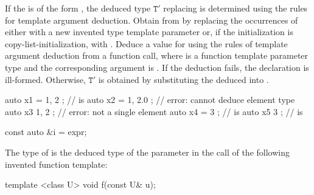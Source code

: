 \pnum
If the  is of the form
 ,
the deduced type
$\mathtt{T}'$ replacing 
is determined using the rules for template argument deduction.
Obtain  from
 by replacing the occurrences of
  either with
a new invented type template parameter  or,
if the initialization is copy-list-initialization, with
. Deduce a value for  using the rules
of template argument deduction from a function call,
where  is a
function template parameter type and
the corresponding argument is .
If the deduction fails, the declaration is ill-formed.
Otherwise, $\mathtt{T}'$ is obtained by
substituting the deduced  into .
\begin{example}
\begin{codeblock}
auto x1 = { 1, 2 };             //  is 
auto x2 = { 1, 2.0 };           // error: cannot deduce element type
auto x3{ 1, 2 };                // error: not a single element
auto x4 = { 3 };                //  is 
auto x5{ 3 };                   //  is 
\end{codeblock}
\end{example}

\begin{example}
\begin{codeblock}
const auto &i = expr;
\end{codeblock}
The type of  is the deduced type of the parameter  in
the call  of the following invented function template:
\begin{codeblock}
template <class U> void f(const U& u);
\end{codeblock}
\end{example}

